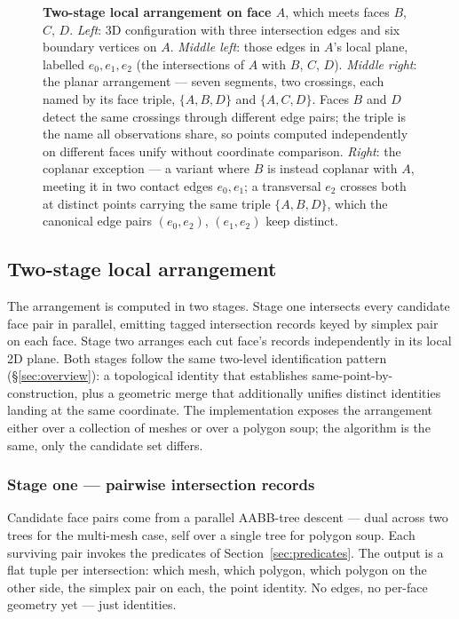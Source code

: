 \documentclass{egpubl}
\begin{document}
\begin{figure}[t]
  \centering
  
  \caption{\textbf{Two-stage local arrangement on face $A$}, which meets faces $B$, $C$, $D$. \emph{Left}: 3D configuration with three intersection edges and six boundary vertices on $A$. \emph{Middle left}: those edges in $A$'s local plane, labelled $e_0, e_1, e_2$ (the intersections of $A$ with $B$, $C$, $D$). \emph{Middle right}: the planar arrangement --- seven segments, two crossings, each named by its face triple, $\{A, B, D\}$ and $\{A, C, D\}$. Faces $B$ and $D$ detect the same crossings through different edge pairs; the triple is the name all observations share, so points computed independently on different faces unify without coordinate comparison. \emph{Right}: the coplanar exception --- a variant where $B$ is instead coplanar with $A$, meeting it in two contact edges $e_0, e_1$; a transversal $e_2$ crosses both at distinct points carrying the same triple $\{A, B, D\}$, which the canonical edge pairs $(e_0, e_2)$, $(e_1, e_2)$ keep distinct.}
  \label{fig:arrangement_pipeline}
\end{figure}

\subsection{Two-stage local arrangement}
\label{sec:arrangement}

The arrangement is computed in two stages. Stage one intersects every candidate face pair in parallel, emitting tagged intersection records keyed by simplex pair on each face. Stage two arranges each cut face's records independently in its local 2D plane. Both stages follow the same two-level identification pattern (\S\ref{sec:overview}): a topological identity that establishes same-point-by-construction, plus a geometric merge that additionally unifies distinct identities landing at the same coordinate. The implementation exposes the arrangement either over a collection of meshes or over a polygon soup; the algorithm is the same, only the candidate set differs.

\subsubsection*{Stage one --- pairwise intersection records}

Candidate face pairs come from a parallel AABB-tree descent --- dual across two trees for the multi-mesh case, self over a single tree for polygon soup. Each surviving pair invokes the predicates of Section~\ref{sec:predicates}. The output is a flat tuple per intersection: which mesh, which polygon, which polygon on the other side, the simplex pair on each, the point identity. No edges, no per-face geometry yet --- just identities.
\end{document}
